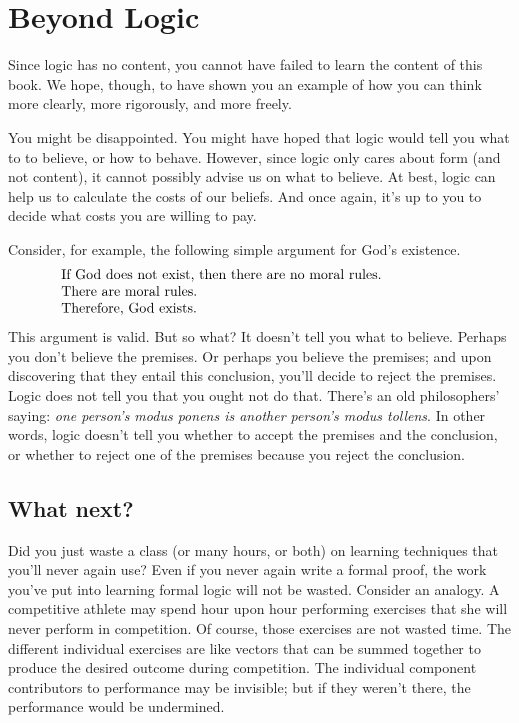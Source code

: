 \chapter{Beyond Logic}

Since logic has no content, you cannot have failed to learn the
content of this book.  We hope, though, to have shown you an example
of how you can think more clearly, more rigorously, and more freely.

You might be disappointed.  You might have hoped that logic would tell
you what to to believe, or how to behave.  However, since logic only
cares about form (and not content), it cannot possibly advise us on
what to believe.  At best, logic can help us to calculate the costs of
our beliefs.  And once again, it's up to you to decide what costs you
are willing to pay.

Consider, for example, the following simple argument for God's
existence.
\[ \begin{array}{p{10cm}}
     If God does not exist, then there are no moral rules. \\
     There are moral rules. \\
     Therefore, God exists. \end{array} \] This argument is valid.
  But so what?  It doesn't tell you what to believe.  Perhaps you
  don't believe the premises.  Or perhaps you believe the premises;
  and upon discovering that they entail this conclusion, you'll decide
  to reject the premises.  Logic does not tell you that you ought not
  do that.  There's an old philosophers' saying: {\it one person's
    modus ponens is another person's modus tollens}.  In other words,
  logic doesn't tell you whether to accept the premises and the
  conclusion, or whether to reject one of the premises because you
  reject the conclusion.

\section{What next?}

Did you just waste a class (or many hours, or both) on learning
techniques that you'll never again use?  Even if you never again write
a formal proof, the work you've put into learning formal logic will
not be wasted.  Consider an analogy.  A competitive athlete may spend
hour upon hour performing exercises that she will never perform in
competition.  Of course, those exercises are not wasted time.  The
different individual exercises are like vectors that can be summed
together to produce the desired outcome during competition.  The
individual component contributors to performance may be invisible; but
if they weren't there, the performance would be undermined.

